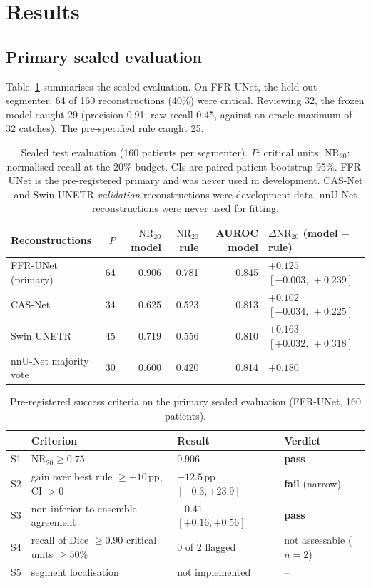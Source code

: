 \documentclass[11pt]{article}
\newcommand{\NR}{\mathrm{NR}_{20}}
\newcommand{\pp}{\,pp}
\begin{document}
\section{Results}
\subsection{Primary sealed evaluation}
Table~\ref{tab:main} summarises the sealed evaluation. On FFR-UNet, the held-out segmenter, 64 of 160 reconstructions (40\%) were critical. Reviewing 32, the frozen model caught 29 (precision 0.91; raw recall 0.45, against an oracle maximum of 32 catches). The pre-specified rule caught 25.

\begin{table}[t]
\centering
\small
\caption{Sealed test evaluation (160 patients per segmenter). $P$: critical units; $\NR$: normalised recall at the 20\% budget. CIs are paired patient-bootstrap 95\%. FFR-UNet is the pre-registered primary and was never used in development. CAS-Net and Swin UNETR \emph{validation} reconstructions were development data. nnU-Net reconstructions were never used for fitting.}
\label{tab:main}
\begin{tabular}{lrrrrl}
\toprule
Reconstructions & $P$ & $\NR$ model & $\NR$ rule & AUROC model & $\Delta\NR$ (model $-$ rule) \\
\midrule
FFR-UNet (primary) & 64 & 0.906 & 0.781 & 0.845 & $+0.125$ $[-0.003,\,+0.239]$ \\
CAS-Net & 34 & 0.625 & 0.523 & 0.813 & $+0.102$ $[-0.034,\,+0.225]$ \\
Swin UNETR & 45 & 0.719 & 0.556 & 0.810 & $+0.163$ $[+0.032,\,+0.318]$ \\
nnU-Net majority vote & 30 & 0.600 & 0.420 & 0.814 & $+0.180$ \\
\bottomrule
\end{tabular}
\end{table}

\begin{table}[t]
\centering
\small
\caption{Pre-registered success criteria on the primary sealed evaluation (FFR-UNet, 160 patients).}
\label{tab:criteria}
\begin{tabularx}{\linewidth}{llXl}
\toprule
 & Criterion & Result & Verdict \\
\midrule
S1 & $\NR \geq 0.75$ & 0.906 & \textbf{pass} \\
S2 & gain over best rule $\geq +10$\pp, CI $> 0$ & $+12.5$\pp\ $[-0.3, +23.9]$ & \textbf{fail} (narrow) \\
S3 & non-inferior to ensemble agreement & $+0.41$ $[+0.16, +0.56]$ & \textbf{pass} \\
S4 & recall of Dice $\geq 0.90$ critical units $\geq 50\%$ & 0 of 2 flagged & not assessable ($n=2$) \\
S5 & segment localisation & not implemented & -- \\
\bottomrule
\end{tabularx}
\end{table}
\end{document}

